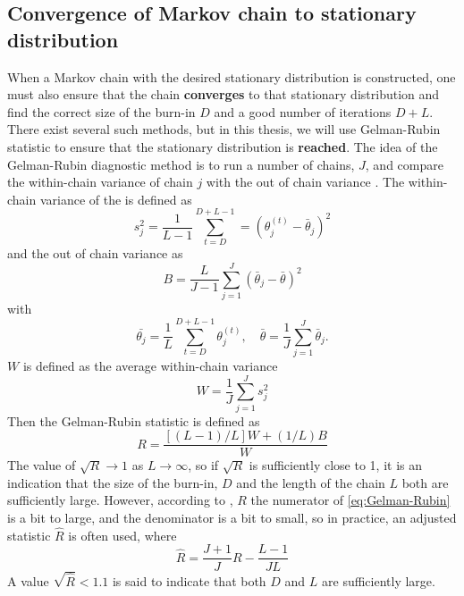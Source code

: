 \documentclass{article}
\theoremstyle{definition}
\begin{document}
\subsection{Convergence of Markov chain to stationary distribution}\label{sec:convergence}
When a Markov chain with the desired stationary distribution is constructed, one must also ensure that the chain \textbf{converges} to that stationary distribution and find the correct size of the burn-in $D$ and a good number of iterations $D+L$. There exist several such methods, but in this thesis, we will use Gelman-Rubin statistic to ensure that the stationary distribution is \textbf{reached}. The idea of the Gelman-Rubin diagnostic method is to run a number of chains, $J$, and compare the within-chain variance of chain $j$ with the out of chain variance \cite{CS}. The within-chain variance of the is defined as 
\begin{equation*}
    s_j^2 = \frac{1}{L-1}\sum_{t = D}^{D + L - 1} = \left(\theta_j^{\left(t\right)} - \bar{\theta}_j\right)^2
\end{equation*}
and the out of chain variance as 
\begin{equation*}
    B = \frac{L}{J-1}\sum_{j=1}^J \left(\bar{\theta}_j - \bar{\theta}\right)^2
\end{equation*}
with 
\begin{equation*}
    \bar{\theta_j} = \frac{1}{L}\sum_{t = D}^{D+L-1} \theta_j^{\left(t\right)}, \quad \bar{\theta} = \frac{1}{J} \sum_{j=1}^J \bar{\theta}_j.
\end{equation*} 
$W$ is defined as the average within-chain variance 
\begin{equation*}
    W = \frac{1}{J} \sum_{j = 1}^J{s_j^2}
\end{equation*}
Then the Gelman-Rubin statistic is defined as 
\begin{equation}\label{eq:Gelman-Rubin}
    R = \frac{\left[\left(L-1\right)/L\right]W + \left(1/L\right)B}{W}
\end{equation}
The value of $\sqrt{R} \xrightarrow{} 1$ as $L \xrightarrow{} \infty$, so if $\sqrt{R}$ is sufficiently close to 1, it is an indication that the size of the burn-in, $D$ and the length of the chain $L$ both are sufficiently large. However, according to \cite{CS}, $R$ the numerator of \ref{eq:Gelman-Rubin} is a bit to large, and the denominator is a bit to small, so in practice, an adjusted statistic $\hat{R}$ is often used, where
\begin{equation}\label{eq:Gelman-Rubin_adjusted}
    \hat{R} = \frac{J+1}{J}R - \frac{L-1}{JL} 
\end{equation}
A value $\sqrt{\hat{R}}<1.1$ is said to indicate that both $D$ and $L$ are sufficiently large.
\end{document}
